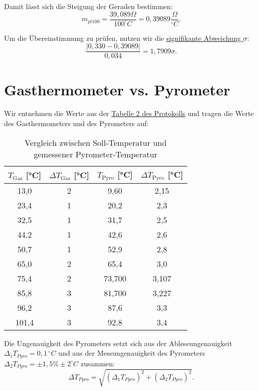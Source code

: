 Damit lässt sich die Steigung der Geraden bestimmen:
\begin{equation}
    m_{pt100} = \frac{39,089\Omega}{100^\circ C} = 0,39089 \frac{\Omega}{^\circ C}.
\end{equation}

Um die Übereinstimmung zu prüfen, nutzen wir die \hyperref[eq:signifikante_abweichung]{signifikante Abweichung $\sigma$}:
\begin{equation}
    \frac{\left| 0,330 - 0,39089 \right|}{0,034} = 1,7909\sigma.
\end{equation}


\section{Gasthermometer vs. Pyrometer}
Wir entnehmen die Werte aus der \hyperref[Protokoll]{Tabelle 2 des Protokolls} und tragen die Werte des Gasthermometers und des Pyrometers auf:

\begin{table}[h!]
    \centering
    \caption{Vergleich zwischen Soll-Temperatur und gemessener Pyrometer-Temperatur}
    \label{tab:ziel_pyrometer}
    \begin{tabular}{c | c | c | c}
        \toprule
        $T_\mathrm{Gas}$ [°C] & $\Delta T_\mathrm{Gas}$ [°C] & $T_\mathrm{Pyro}$ [°C] & $\Delta T_\mathrm{Pyro}$ [°C] \\ 
        \midrule
        13,0  & 2 & 9,60   & 2,15  \\
        23,4  & 1 & 20,2   & 2,3   \\
        32,5  & 1 & 31,7   & 2,5   \\
        44,2  & 1 & 42,6   & 2,6   \\
        50,7  & 1 & 52,9   & 2,8   \\
        65,0  & 2 & 65,4   & 3,0   \\
        75,4  & 2 & 73,700 & 3,107 \\
        85,8  & 3 & 81,700 & 3,227 \\
        96,2  & 3 & 87,6   & 3,3   \\
        101,4 & 3 & 92,8   & 3,4   \\
        \bottomrule
    \end{tabular}
\end{table}

Die Ungenauigkeit des Pyrometers setzt sich aus der Ableseungenauigkeit $\Delta_1 T_{Pyro} = 0,1 \, ^\circ C$ und aus der Messungenauigkeit des Pyrometers $\Delta_2 T_{Pyro} = \pm 1,5\% \pm 2^\circ C$ zusammen:
\begin{equation}
    \Delta T_{Pyro} = \sqrt{(\Delta_1 T_{Pyro})^2 + (\Delta_2 T_{Pyro})^2}.
\end{equation}

